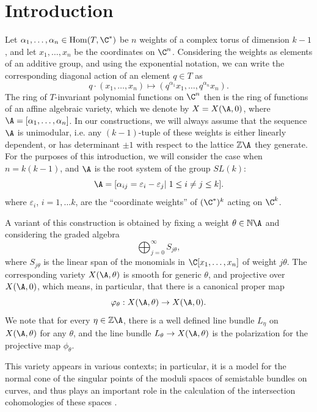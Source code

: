 \section{Introduction}\label{sec:intro} 

Let $ 
\alpha_1,\dots,\alpha_n\in\mathrm{Hom}(T,\C^*) $ be $ n $ weights of a complex 
torus of dimension $ k-1 $, and let $ x_1, \ldots, x_n $ be the  coordinates 
on $ \C^n $. Considering the weights as elements of an additive group, and 
using the exponential notation, we can write the corresponding diagonal action 
of an element $ q\in T $ as
\[    q\cdot (x_1,\dots, x_n)  \mapsto ( q^{\alpha_1}x_1,\dots,q^{\alpha_n} 
x_n).
 \]
The ring of $ T $-invariant polynomial functions on $ \C^n $ then is the ring 
of functions of an affine algebraic variety, which we denote by $X=X(\A,0)$, 
where  $ \A=[\alpha_1,\dots,\alpha_n ]$. 
In our constructions, we will always assume that the sequence
$ \A$ is unimodular, i.e.  any $ (k-1) $-tuple of these 
weights is either linearly dependent, or has determinant $ \pm1 $ with respect 
to the lattice $\mathbb{Z}\A$ they generate. For the purposes of this introduction, 
we will consider the case when $ n= k(k-1) $, and $ \A $ is the root system of 
the group $ SL(k) $:
\[ \A = [ \alpha_{ij}=\varepsilon_i - \varepsilon_j|\; 1\le i\neq j\le k ]. 
\]
where $ \varepsilon_i $, $ i=1,\dots k $, are the ``coordinate weights'' of 
$ (\C^*)^k $ acting on $ \C^k$. 

A variant of this construction is obtained by fixing a weight $ \theta\in\mathbb{N}\A
$ and considering the graded algebra 
\[    \bigoplus_{j=0}^\infty S_{j\theta}, \]
where $  S_{j\theta}$ is the linear span of the monomials in $\C 
[x_1,\ldots, x_n] $ of weight $ j\theta $. The corresponding variety $ 
X(\A,\theta) $ is smooth for generic $ \theta $, and projective over ${X}(\A,0)$, 
which means, in particular, that there is a canonical proper map 
$$ \varphi_\theta:X(\A,\theta) \to X(\A,0).$$ We note that for every $ 
\eta\in\mathbb{Z}\A  $, 
there is a well defined line bundle $ L_\eta $ on $ X(\A,\theta) $ for any $ 
\theta$, and  the line bundle 
$ L_\theta\to X(\A,\theta) $ is the polarization for the projective map $ \phi_\theta $.


This variety appears in various contexts; in particular, it is a model for the 
normal cone of the singular points
of the moduli spaces of semistable bundles on curves, and thus plays an
important role in the calculation of the intersection cohomologies of these 
spaces \cite{MeinRein, MozgovoyRein, cfotasz}.


